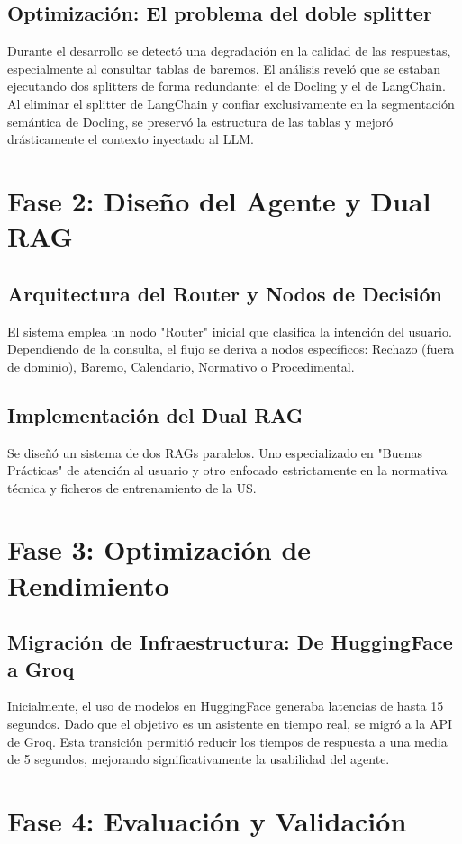 \documentclass[12pt,a4paper,oneside]{report}
\begin{document}
\section{Optimización: El problema del doble splitter}
Durante el desarrollo se detectó una degradación en la calidad de las respuestas, especialmente al consultar tablas de baremos. El análisis reveló que se estaban ejecutando dos splitters de forma redundante: el de Docling y el de LangChain. Al eliminar el splitter de LangChain y confiar exclusivamente en la segmentación semántica de Docling, se preservó la estructura de las tablas y mejoró drásticamente el contexto inyectado al LLM.

\chapter{Fase 2: Diseño del Agente y Dual RAG}
\section{Arquitectura del Router y Nodos de Decisión}
El sistema emplea un nodo "Router" inicial que clasifica la intención del usuario. Dependiendo de la consulta, el flujo se deriva a nodos específicos: Rechazo (fuera de dominio), Baremo, Calendario, Normativo o Procedimental.

\section{Implementación del Dual RAG}
Se diseñó un sistema de dos RAGs paralelos. Uno especializado en "Buenas Prácticas" de atención al usuario y otro enfocado estrictamente en la normativa técnica y ficheros de entrenamiento de la US.

\chapter{Fase 3: Optimización de Rendimiento}
\section{Migración de Infraestructura: De HuggingFace a Groq}
Inicialmente, el uso de modelos en HuggingFace generaba latencias de hasta 15 segundos. Dado que el objetivo es un asistente en tiempo real, se migró a la API de Groq. Esta transición permitió reducir los tiempos de respuesta a una media de 5 segundos, mejorando significativamente la usabilidad del agente.

\chapter{Fase 4: Evaluación y Validación}
\end{document}
